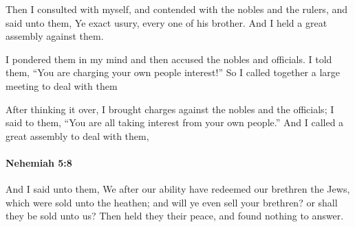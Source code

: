 			\begin{versebox}
					\item[BHS] 
					\item[LXX] 
					\item[ASV] Then I consulted with myself, and contended with the nobles and the rulers, and said unto them, Ye exact usury, every one of his brother. And I held a great assembly against them.
					\item[NIV] I pondered them in my mind and then accused the nobles and officials. I told them, “You are charging your own people interest!” So I called together a large meeting to deal with them
					\item[NRSV] After thinking it over, I brought charges against the nobles and the officials; I said to them, “You are all taking interest from your own people.” And I called a great assembly to deal with them,
			\end{versebox}

		\paragraph{Nehemiah 5:8} %
			\label{NEHEMIAH-5-8}

			And I said unto them, We after our ability have redeemed our brethren the Jews, which were sold unto the heathen; and will ye even sell your brethren? or shall they be sold unto us? Then held they their peace, and found nothing to answer.

